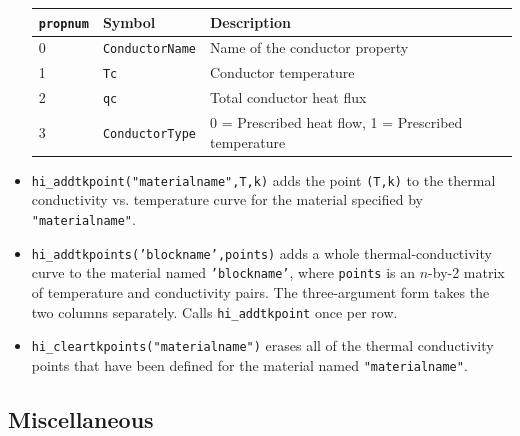 \begin{itemize}
\begin{tabular}{lll}
\texttt{propnum} & Symbol & Description \\ \hline
  0 & \texttt{ConductorName} & Name of the conductor property \\
  1 & \texttt{Tc} &  Conductor temperature \\
  2 & \texttt{qc} &  Total conductor heat flux \\
  3 & \texttt{ConductorType} & 0 = Prescribed heat flow, 1 = Prescribed temperature
\end{tabular}

\item \texttt{hi\_addtkpoint("materialname",T,k)} adds
the point {\tt (T,k)} to the thermal conductivity vs. temperature curve for the material specified by
{\tt "materialname"}.

\item{\tt hi\_addtkpoints('blockname',points)} adds a whole thermal-conductivity curve to the material named {\tt 'blockname'}, where {\tt points} is an $n$-by-2 matrix of temperature and conductivity pairs. The three-argument form takes the two columns separately. Calls {\tt hi\_addtkpoint} once per row.

\item \texttt{hi\_cleartkpoints("materialname")} erases
all of the thermal conductivity points that have been defined for the material named
{\tt "materialname"}.

\end{itemize}

\subsection{Miscellaneous}

